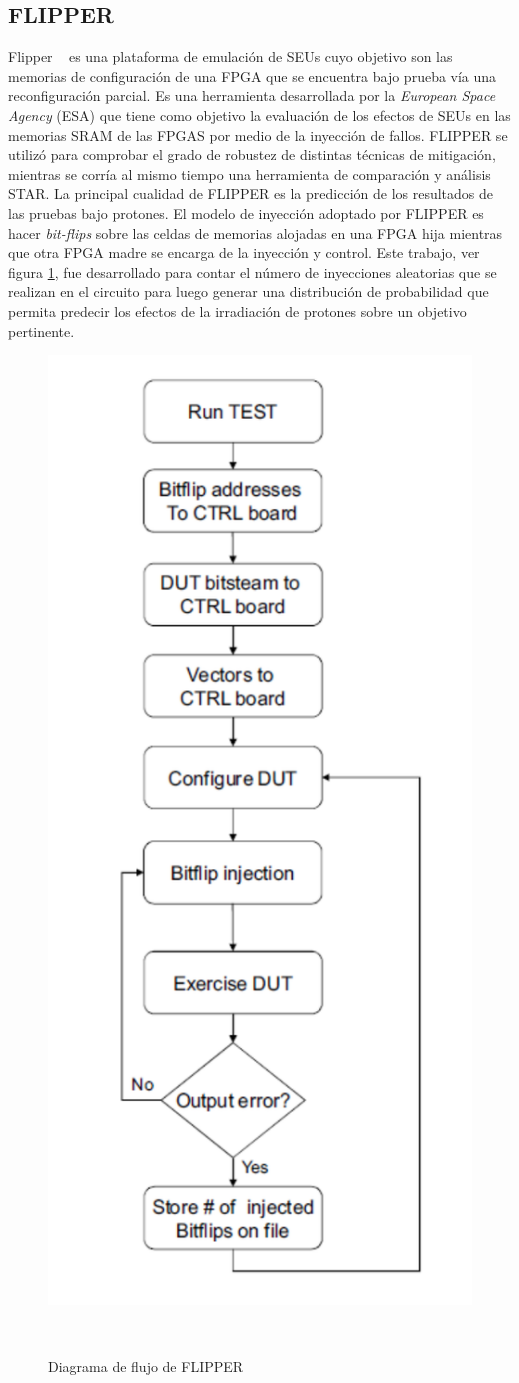 \documentclass[a4paper,openright,12pt]{report}
\begin{document}
\subsection{FLIPPER} Flipper ~\cite{Alderighi2010} es una plataforma de emulación de SEUs cuyo objetivo son las memorias de configuración de una FPGA que se encuentra bajo prueba vía una reconfiguración parcial.
Es una herramienta desarrollada por la  \textit{European Space Agency} (ESA) que tiene como objetivo la evaluación de los efectos de SEUs en las memorias SRAM de las FPGAS por medio de la inyección de fallos. FLIPPER se utilizó para comprobar  el grado de robustez de distintas técnicas de mitigación, mientras  se corría al mismo tiempo una herramienta de comparación y análisis STAR. La principal cualidad de FLIPPER es la predicción de los resultados de las pruebas bajo protones. 
El modelo de inyección  adoptado por FLIPPER es hacer \textit{bit-flips} sobre las celdas de memorias alojadas en una FPGA hija mientras que otra FPGA madre se encarga de la inyección y control.
Este trabajo, ver figura \ref{Flipper},  fue desarrollado para contar el número de inyecciones aleatorias que se realizan en el circuito para luego generar una distribución de probabilidad que permita predecir los efectos de la irradiación de protones sobre un objetivo pertinente.  

\begin{figure}[H]
	\centering
	\includegraphics[width=0.40 \textwidth]{img/FLIPPER.pdf}
	\caption{Diagrama de flujo de FLIPPER}
     ~\cite{Alderighi2010}
	\label{Flipper}
\end{figure}
\end{document}
